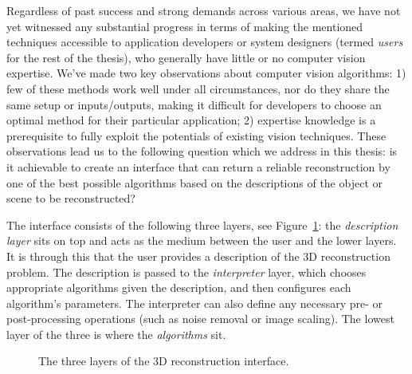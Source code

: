 Regardless of past success and strong demands across various areas, we have not yet witnessed any substantial progress in terms of making the mentioned techniques accessible to application developers or system designers (termed \textit{users} for the rest of the thesis), who generally have little or no computer vision expertise. We've made two key observations about computer vision algorithms: 1) few of these methods work well under all circumstances, nor do they share the same setup or inputs/outputs, making it difficult for developers to choose an optimal method for their particular application; 2) expertise knowledge is a prerequisite to fully exploit the potentials of existing vision techniques. These observations lead us to the following question which we address in this thesis: is it achievable to create an interface that can return a reliable reconstruction by one of the best possible algorithms based on the descriptions of the object or scene to be reconstructed?

The interface consists of the following three layers, see Figure~\ref{fig:interface_overview}: the \textit{description layer} sits on top and acts as the medium between the user and the lower layers. It is through this that the user provides a description of the 3D reconstruction problem. The description is passed to the \textit{interpreter} layer, which chooses appropriate algorithms given the description, and then configures each algorithm's parameters. The interpreter can also define any necessary pre- or post-processing operations (such as noise removal or image scaling). The lowest layer of the three is where the \textit{algorithms} sit.
\begin{figure}[!htbp]
\centering
{}
\caption{The three layers of the 3D reconstruction interface.}
\label{fig:interface_overview}
\end{figure}


